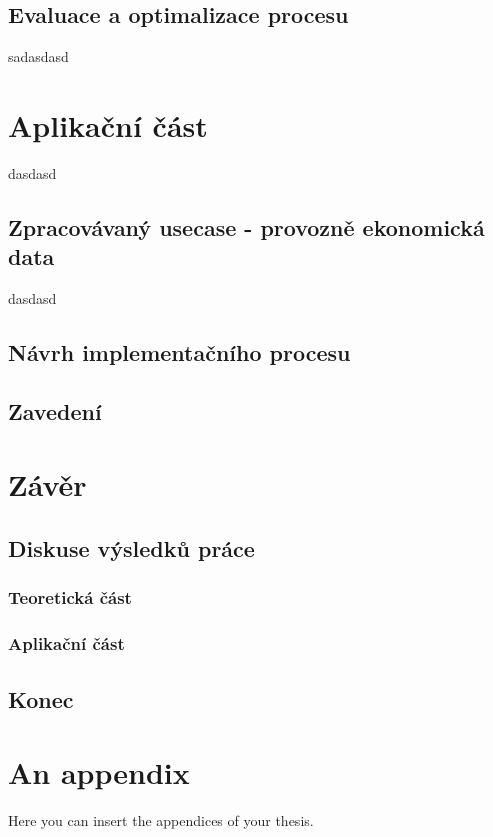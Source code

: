 \documentclass[
  digital,     %
  twoside,     %
  lof,         %
  lot,         %
]{fithesis4}
\begin{document}
\section{Evaluace a optimalizace procesu}
sadasdasd




\chapter{Aplikační část}
dasdasd

\section{Zpracovávaný usecase - provozně ekonomická data}
dasdasd


\section{Návrh implementačního procesu}
\section{Zavedení}

\chapter{Závěr}
\section{Diskuse výsledků práce}
\subsection{Teoretická část}
\subsection{Aplikační část}
\section{Konec}

\printbibliography[heading=bibintoc] %

  \makeatletter\thesis@blocks@clear\makeatother
  \printindex

\appendix %
\chapter{An appendix}
Here you can insert the appendices of your thesis.
\end{document}
